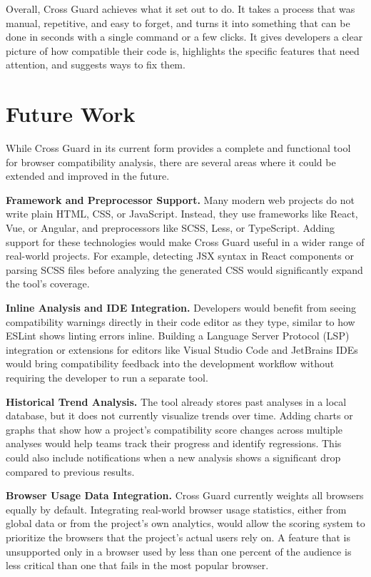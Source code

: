Overall, Cross Guard achieves what it set out to do. It takes a process that was manual, repetitive, and easy to forget, and turns it into something that can be done in seconds with a single command or a few clicks. It gives developers a clear picture of how compatible their code is, highlights the specific features that need attention, and suggests ways to fix them.

\section{Future Work}
\label{sec:future}

While Cross Guard in its current form provides a complete and functional tool for browser compatibility analysis, there are several areas where it could be extended and improved in the future.

\textbf{Framework and Preprocessor Support.} Many modern web projects do not write plain HTML, CSS, or JavaScript. Instead, they use frameworks like React, Vue, or Angular, and preprocessors like SCSS, Less, or TypeScript. Adding support for these technologies would make Cross Guard useful in a wider range of real-world projects. For example, detecting JSX syntax in React components or parsing SCSS files before analyzing the generated CSS would significantly expand the tool's coverage.

\textbf{Inline Analysis and IDE Integration.} Developers would benefit from seeing compatibility warnings directly in their code editor as they type, similar to how ESLint shows linting errors inline. Building a Language Server Protocol (LSP) integration or extensions for editors like Visual Studio Code and JetBrains IDEs would bring compatibility feedback into the development workflow without requiring the developer to run a separate tool.

\textbf{Historical Trend Analysis.} The tool already stores past analyses in a local database, but it does not currently visualize trends over time. Adding charts or graphs that show how a project's compatibility score changes across multiple analyses would help teams track their progress and identify regressions. This could also include notifications when a new analysis shows a significant drop compared to previous results.

\textbf{Browser Usage Data Integration.} Cross Guard currently weights all browsers equally by default. Integrating real-world browser usage statistics, either from global data or from the project's own analytics, would allow the scoring system to prioritize the browsers that the project's actual users rely on. A feature that is unsupported only in a browser used by less than one percent of the audience is less critical than one that fails in the most popular browser.

